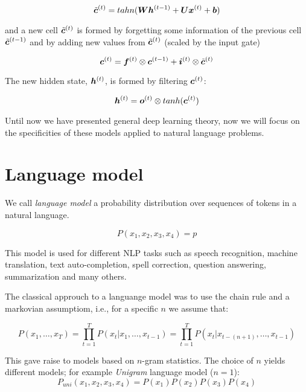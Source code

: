 \begin{equation}
\tilde{\bm{c}}^{(t)} = tahn(\bm{W} \bm{h}^{(t-1)} + \bm{U} \bm{x}^{(t)} + \bm{b})
\end{equation}

and a new cell $\tilde{\bm{c}}^{(t)}$ is formed by forgetting some information of the previous cell $\tilde{\bm{c}}^{(t-1)}$ and by adding new values from $\tilde{\bm{c}}^{(t)}$ (scaled by the input gate)

\begin{equation}
\bm{c}^{(t)} = \bm{f}^{(t)} \otimes \bm{c}^{(t-1)} + \bm{i}^{(t)}\otimes \tilde{\bm{c}}^{(t)}
\end{equation}

The new hidden state, $\bm{h}^{(t)}$, is formed by filtering $\bm{c}^{(t)}$:

\begin{equation}
\bm{h}^{(t)} = \bm{o}^{(t)} \otimes tanh(\bm{c}^{(t)})
\end{equation}


Until now we have presented general deep learning theory, now we will focus on the specificities of these models applied to natural language problems.


\section{Language model}

We call \textit{language model} a probability distribution over sequences of tokens in a natural language.

\[
P(x_1,x_2,x_3,x_4) = p
\]

This model is used for different NLP tasks such as speech recognition, machine translation, text auto-completion, spell correction, question answering, summarization and many others.

The classical approuch to a languange model was to use the chain rule and a markovian assumptiom, i.e., for a specific $n$ we assume that:

\begin{equation}
P(x_1, \dots, x_T) = \prod_{t=1}^{T} P(x_t \vert x_1, \dots, x_{t-1}) = \prod_{t=1}^{T} P(x_{t} \vert x_{t - (n+1)}, \dots, x_{t-1})
\end{equation} 


This gave raise to models based on $n$-gram statistics. The choice of $n$ yields different models; for example 
\textit{Unigram} language model ($n=1$): 
\begin{equation}
P_{uni}(x_1, x_2, x_3, x_4) = P(x_1)P(x_2)P(x_3)P(x_4)
\end{equation}

